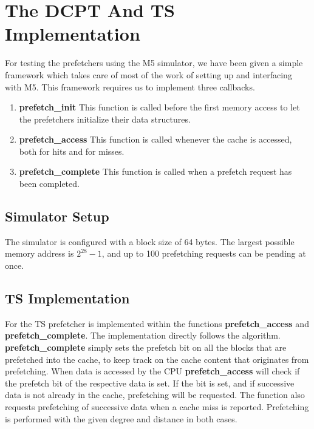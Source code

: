 \section{The DCPT And TS Implementation}

\label{section:scheme}

For testing the prefetchers using the M5 simulator, we have been given a simple
framework which takes care of most of the work of setting up and interfacing with
M5. This framework requires us to implement three callbacks. 

\begin{enumerate}
	\item \textbf{prefetch\_init}
		This function is called before the first memory access to let the
		prefetchers initialize their data structures.
	\item \textbf{prefetch\_access}
		This function is called whenever the cache is accessed, both for hits
		and for misses.
	\item \textbf{prefetch\_complete}
		This function is called when a prefetch request has been completed.
\end{enumerate}

\subsection{Simulator Setup}


The simulator is configured with a block size of 64 bytes. The largest possible
memory address is $2^{28}-1$, and up to 100 prefetching requests can be pending
at once.

\subsection{TS Implementation}

For the TS prefetcher is implemented within the functions
\textbf{prefetch\_access} and \textbf{prefetch\_complete}. The 
implementation directly follows the algorithm. 
\textbf{prefetch\_complete} simply sets the prefetch bit on all the 
blocks that are prefetched into the cache, to keep track on the cache content 
that originates from prefetching. When data is accessed by the CPU 
\textbf{prefetch\_access} will check if the 
prefetch bit of the respective data is set. If the bit is set, and if successive 
data is not already in the cache, prefetching will be requested. 
The function also requests prefetching of successive data when a cache 
miss is reported. Prefetching is performed with the given degree 
and distance in both cases.



